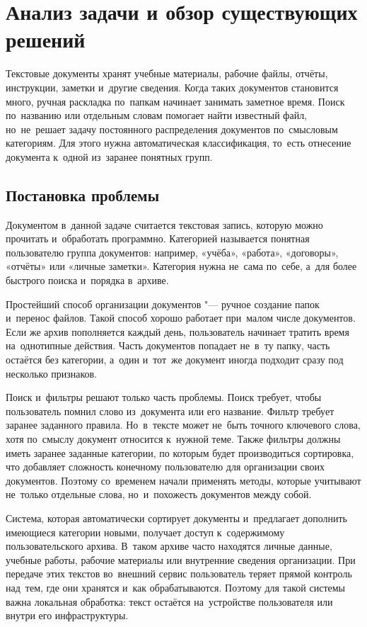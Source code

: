 \chapter{Анализ задачи и обзор существующих решений}\label{ch:problem}

Текстовые документы хранят учебные материалы, рабочие файлы, отчёты,
инструкции, заметки и~другие сведения. Когда таких документов становится много,
ручная раскладка по~папкам начинает занимать заметное время. Поиск по~названию
или отдельным словам помогает найти известный файл, но~не~решает задачу
постоянного распределения документов по~смысловым категориям. Для этого нужна
автоматическая классификация, то~есть отнесение документа к~одной из~заранее
понятных групп.

\section{Постановка проблемы}\label{sec:ch1/domain}

Документом в~данной задаче считается текстовая запись, которую можно прочитать
и~обработать программно. Категорией называется понятная
пользователю группа документов: например, «учёба», «работа», «договоры»,
«отчёты» или «личные заметки». Категория нужна не~сама по~себе, а~для более
быстрого поиска и~порядка в~архиве.

Простейший способ организации документов "--- ручное создание папок и~перенос
файлов. Такой способ хорошо работает при~малом числе документов. Если же архив
пополняется каждый день, пользователь начинает тратить время на~однотипные
действия. Часть документов попадает не~в~ту папку, часть остаётся без категории,
а~один и~тот~же документ иногда подходит сразу под несколько признаков.

Поиск и~фильтры решают только часть проблемы. Поиск требует, чтобы пользователь
помнил слово из~документа или его название. Фильтр требует заранее заданного
правила. Но~в~тексте может не~быть точного ключевого слова, хотя по~смыслу
документ относится к~нужной теме. Также фильтры должны иметь заранее заданные
категории, по которым будет производиться сортировка, что добавляет сложность
конечному пользователю для организации своих документов. Поэтому со~временем
начали применять методы, которые учитывают не~только отдельные слова,
но~и~похожесть документов между собой.

Система, которая автоматически сортирует документы и~предлагает дополнить
имеющиеся категории новыми, получает доступ к~содержимому пользовательского
архива. В~таком архиве часто находятся личные данные, учебные работы, рабочие
материалы или внутренние сведения организации. При передаче этих текстов
во~внешний сервис пользователь теряет прямой контроль над~тем, где они хранятся
и~как обрабатываются. Поэтому для такой системы важна локальная обработка:
текст остаётся на~устройстве пользователя или внутри его инфраструктуры.

